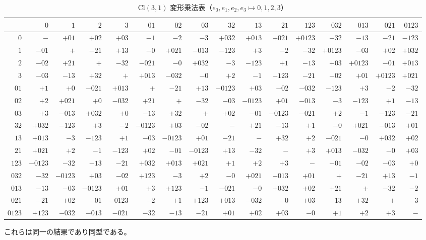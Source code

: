 \documentclass[a4paper]{article}
\begin{document}
\begin{table}[ht]
  \begin{center}
    \caption{$\mathrm{Cl}(3,1)$ 変形乗法表（$e_0, e_1, e_2, e_3 \mapsto 0,1,2,3$）}
    \scriptsize
    \begin{tabular}{r|rrrrrrrrrrrrrrr}
      &$0$&$1$&$2$&$3$&$01$&$02$&$03$&$32$&$13$&$21$&$123$&$032$&$013$&$021$&$0123$\\\hline
      $0$&$-$&$+01$&$+02$&$+03$&$-1$&$-2$&$-3$&$+032$&$+013$&$+021$&$+0123$&$-32$&$-13$&$-21$&$-123$\\
      $1$&$-01$&$+$&$-21$&$+13$&$-0$&$+021$&$-013$&$-123$&$+3$&$-2$&$-32$&$+0123$&$-03$&$+02$&$+032$\\
      $2$&$-02$&$+21$&$+$&$-32$&$-021$&$-0$&$+032$&$-3$&$-123$&$+1$&$-13$&$+03$&$+0123$&$-01$&$+013$\\
      $3$&$-03$&$-13$&$+32$&$+$&$+013$&$-032$&$-0$&$+2$&$-1$&$-123$&$-21$&$-02$&$+01$&$+0123$&$+021$\\
      $01$&$+1$&$+0$&$-021$&$+013$&$+$&$-21$&$+13$&$-0123$&$+03$&$-02$&$-032$&$-123$&$+3$&$-2$&$-32$\\
      $02$&$+2$&$+021$&$+0$&$-032$&$+21$&$+$&$-32$&$-03$&$-0123$&$+01$&$-013$&$-3$&$-123$&$+1$&$-13$\\
      $03$&$+3$&$-013$&$+032$&$+0$&$-13$&$+32$&$+$&$+02$&$-01$&$-0123$&$-021$&$+2$&$-1$&$-123$&$-21$\\
      $32$&$+032$&$-123$&$+3$&$-2$&$-0123$&$+03$&$-02$&$-$&$+21$&$-13$&$+1$&$-0$&$+021$&$-013$&$+01$\\
      $13$&$+013$&$-3$&$-123$&$+1$&$-03$&$-0123$&$+01$&$-21$&$-$&$+32$&$+2$&$-021$&$-0$&$+032$&$+02$\\
      $21$&$+021$&$+2$&$-1$&$-123$&$+02$&$-01$&$-0123$&$+13$&$-32$&$-$&$+3$&$+013$&$-032$&$-0$&$+03$\\
      $123$&$-0123$&$-32$&$-13$&$-21$&$+032$&$+013$&$+021$&$+1$&$+2$&$+3$&$-$&$-01$&$-02$&$-03$&$+0$\\
      $032$&$-32$&$-0123$&$+03$&$-02$&$+123$&$-3$&$+2$&$-0$&$+021$&$-013$&$+01$&$+$&$-21$&$+13$&$-1$\\
      $013$&$-13$&$-03$&$-0123$&$+01$&$+3$&$+123$&$-1$&$-021$&$-0$&$+032$&$+02$&$+21$&$+$&$-32$&$-2$\\
      $021$&$-21$&$+02$&$-01$&$-0123$&$-2$&$+1$&$+123$&$+013$&$-032$&$-0$&$+03$&$-13$&$+32$&$+$&$-3$\\
      $0123$&$+123$&$-032$&$-013$&$-021$&$-32$&$-13$&$-21$&$+01$&$+02$&$+03$&$-0$&$+1$&$+2$&$+3$&$-$\\
    \end{tabular}
  \end{center}
\end{table}
これらは同一の結果であり同型である。
\clearpage
\end{document}
